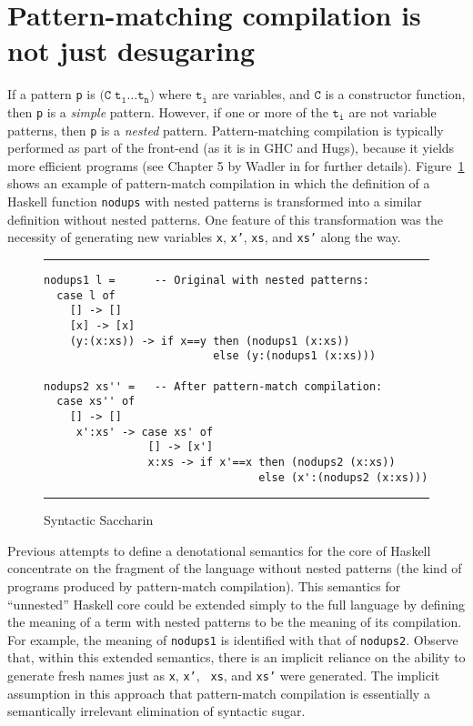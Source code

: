 \documentclass{entcs} \usepackage{entcsmacro}
\begin{document}
{%

\section{Pattern-matching compilation is not just desugaring}

If a pattern {\tt p} is \(\mathtt{(C}\; \mathtt{t_1}\ldots \mathtt{t_n)}\) where
$\mathtt{t_i}$ are variables, and $\mathtt{C}$ is a constructor function, then
{\tt p} is a {\em simple} pattern. However, if one or more of the $\mathtt{t_i}$
are not variable patterns, then {\tt p} is a {\em nested} pattern.
Pattern-matching compilation\cite{PeytonJones86,SCP::JonesS1998} is typically performed as part of
the front-end (as it is in GHC and Hugs), because it yields more efficient
programs (see Chapter 5 by Wadler in \cite{PeytonJones86} for further details).
Figure~\ref{SyntacticSaccharin} shows an example of pattern-match compilation in
which the definition of a Haskell function {\tt nodups} with nested patterns is
transformed into a similar definition without nested patterns. One feature of this
transformation was the necessity of generating new variables {\tt x}, {\tt x'},
{\tt xs}, and {\tt xs'} along the way.


\begin{figure}
\hrule
\vspace{1.5ex}

{\small
\begin{verbatim}
nodups1 l =      -- Original with nested patterns:
  case l of
    [] -> []      
    [x] -> [x]
    (y:(x:xs)) -> if x==y then (nodups1 (x:xs)) 
                          else (y:(nodups1 (x:xs)))
                          
nodups2 xs'' =   -- After pattern-match compilation: 
  case xs'' of 
    [] -> []      
     x':xs' -> case xs' of
                [] -> [x']
                x:xs -> if x'==x then (nodups2 (x:xs)) 
                                 else (x':(nodups2 (x:xs)))
\end{verbatim}
}
\caption{Syntactic Saccharin}
\vspace{1.5ex}
\hrule
\label{SyntacticSaccharin}
\end{figure}


Previous attempts\cite{PeytonJone92a,PeytonJones:1998:TBO} to define a denotational semantics for the core of
Haskell concentrate on the fragment of the language without nested patterns (the
kind of programs produced by pattern-match compilation). This semantics for
``unnested'' Haskell core could be extended simply to the full language by
defining the meaning of a term with nested patterns to be the meaning of its
compilation. For example, the meaning of {\tt nodups1} is identified with that of
{\tt nodups2}. Observe that, within this extended semantics, there is an implicit
reliance on the ability to generate fresh names just as {\tt x}, {\tt x'}, {\tt
xs}, and {\tt xs'} were generated. The implicit assumption in this approach
that pattern-match compilation is essentially a semantically irrelevant
elimination of syntactic sugar.

}
\end{document}
